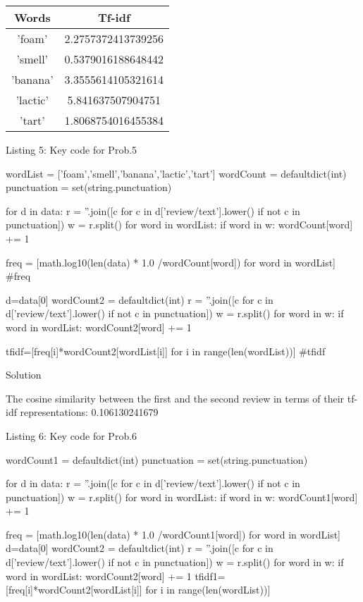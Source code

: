 \documentclass{assignment}
\begin{document}
\begin{problemlist}
\begin{table}[H]
\begin{tabular}{|c|c|}
\hline
Words & Tf-idf \\
\hline
'foam' & 2.2757372413739256\\
\hline
'smell' &  0.5379016188648442 \\
\hline
'banana' & 3.3555614105321614 \\
\hline
'lactic'& 5.841637507904751 \\
\hline
'tart' &  1.8068754016455384 \\
\hline
\end{tabular}
\end{table}

\begin{center} 
Listing 5: Key code for Prob.5
\end{center}
\begin{python}
wordList = ['foam','smell','banana','lactic','tart']
wordCount = defaultdict(int)
punctuation = set(string.punctuation)

for d in data:
  r = ''.join([c for c in d['review/text'].lower() if not c in punctuation])
  w = r.split()
  for word in wordList:
    if word in w:
      wordCount[word] += 1

freq = [math.log10(len(data) * 1.0 /wordCount[word]) for word in wordList]
#freq

d=data[0]
wordCount2 = defaultdict(int)
r = ''.join([c for c in d['review/text'].lower() if not c in punctuation])
w = r.split()
for word in w:
    if word in wordList:
      wordCount2[word] += 1

tfidf=[freq[i]*wordCount2[wordList[i]] for i in range(len(wordList))]
#tfidf
\end{python}

\pbitem Solution
\vspace{2ex}

The cosine similarity between the ﬁrst and the second review in terms of their tf-idf representations: 0.106130241679

\begin{center} 
Listing 6: Key code for Prob.6
\end{center}
\begin{python}
wordCount1 = defaultdict(int)
punctuation = set(string.punctuation)

for d in data:
  r = ''.join([c for c in d['review/text'].lower() if not c in punctuation])
  w = r.split()
  for word in wordList:
    if word in w:
      wordCount1[word] += 1

freq = [math.log10(len(data) * 1.0 /wordCount1[word]) for word in wordList]
d=data[0]
wordCount2 = defaultdict(int)
r = ''.join([c for c in d['review/text'].lower() if not c in punctuation])
w = r.split()
for word in w:
    if word in wordList:
      wordCount2[word] += 1
tfidf1=[freq[i]*wordCount2[wordList[i]] for i in range(len(wordList))]


\end{python}
\end{problemlist}
\end{document}
